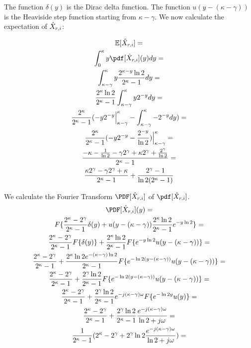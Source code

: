 The function $\delta(y)$ is the Dirac delta function. The function $u(y - (\kappa - \gamma))$ is the Heaviside step function
starting from $\kappa - \gamma$.
We now calculate the expectation of $\hat X_{r, i}$:

\begin{gather*}
  \E[\HX_{r, i}] = \\
  \int_{0}^{\kappa} y \pdf[\HX_{r, i}](y) dy = \\
  \int_{\kappa - \gamma}^{\kappa}{y \frac{2^{\kappa - y} \ln 2}{2^\kappa - 1} dy} = \\
  \frac{2^\kappa \ln 2}{2^\kappa - 1} \int_{\kappa - \gamma}^{\kappa}{y 2^{- y} dy} = \\
  \frac{2^\kappa}{2^\kappa - 1} (-y 2^{-y}\Big|_{\kappa - \gamma}^{\kappa} - \int_{\kappa - \gamma}^{\kappa}{-2^{- y} dy}) = \\
  \frac{2^\kappa}{2^\kappa - 1} (-y 2^{-y} - \frac{2^{-y}}{\ln 2}) \Big|_{\kappa - \gamma}^{\kappa} = \\
  \frac{-\kappa - \frac{1}{\ln2} - \gamma 2^\gamma + \kappa 2^\gamma + \frac{2^\gamma}{\ln 2}}{2^\kappa - 1} = \\
  \frac{\kappa 2^\gamma - \gamma 2^\gamma + \kappa}{2^\kappa - 1} + \frac{2^\gamma - 1}{\ln 2 (2^\kappa - 1)}
\end{gather*}

We calculate the Fourier Transform $\PDF[\HX_{r,i}]$ of $\pdf[\HX_{r,i}]$.
\begin{gather*}
  \PDF[\HX_{r,i}](y) = \\
  F\{\frac{2^\kappa - 2^\gamma}{2^\kappa - 1} \delta(y) + u(y - (\kappa - \gamma)) \frac{2^{\kappa} \ln 2}{2^\kappa - 1} e^{-y\ln2}\} = \\
  \frac{2^\kappa - 2^\gamma}{2^\kappa - 1}F\{\delta(y)\} + \frac{2^{\kappa} \ln 2}{2^\kappa - 1} F\{e^{-y\ln2} u(y - (\kappa - \gamma))\} = \\
  \frac{2^\kappa - 2^\gamma}{2^\kappa - 1} + \frac{2^{\kappa} \ln 2 e^{-(\kappa - \gamma)\ln2}}{2^\kappa - 1} F\{e^{-\ln2(y - (\kappa - \gamma))} u(y - (\kappa - \gamma))\} = \\
  \frac{2^\kappa - 2^\gamma}{2^\kappa - 1} + \frac{2^{\gamma} \ln 2}{2^\kappa - 1} F\{e^{-\ln2(y - (\kappa - \gamma))} u(y - (\kappa - \gamma))\} = \\
  \frac{2^\kappa - 2^\gamma}{2^\kappa - 1} + \frac{2^{\gamma} \ln 2}{2^\kappa - 1} e^{-j(\kappa - \gamma)\omega} F\{e^{-\ln2y} u(y)\} = \\
  \frac{2^\kappa - 2^\gamma}{2^\kappa - 1} + \frac{2^{\gamma} \ln 2}{2^\kappa - 1} \frac{e^{-j(\kappa - \gamma)\omega}}{\ln2 + j\omega} = \\
  \frac{1}{2^\kappa - 1} (2^\kappa - 2^\gamma + 2^{\gamma} \ln 2 \frac{e^{-j(\kappa - \gamma)\omega}}{\ln2 + j\omega}) = \\
\end{gather*}

